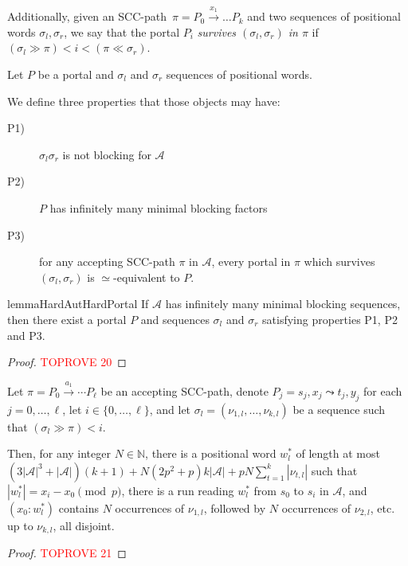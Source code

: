 \documentclass[letterpaper, USenglish, cleveref, autoref, thm-restate, numberwithinsect]{lipics-v2021}
\theoremstyle{theorem}
\theoremstyle{definition}
\newcommand{\Aa}{\mathcal{A}}
\newcommand{\curly}{\mathrel{\leadsto}}
\newcommand{\equivportals}{\simeq}
\newcommand{\lefteffect}[2]{(#1 \gg #2)}
\newcommand{\NN}{\mathbb{N}}
\newcommand{\portal}[4]{#1,#2 \curly #3, #4}
\newcommand{\righteffect}[2]{(#2 \ll #1)}
\newcommand{\SCCpath}{\pi}
\newcommand{\set}[1]{\{ #1 \}}
\newcommand{\timedword}[2]{(#1:#2)}
\begin{document}
Additionally, given an SCC-path~$\SCCpath = P_0\xrightarrow{x_1} \ldots P_k$ and two sequences of positional words $\sigma_l, \sigma_r$, we say that the portal $P_i$ \emph{survives $(\sigma_l, \sigma_r)$ in $\SCCpath$} if $\lefteffect{\sigma_l}{\SCCpath} < i < \righteffect{\sigma_r}{\SCCpath}$.

\begin{definition}
	Let $P$ be a portal and  $\sigma_l$ and $\sigma_r$ sequences of positional words.
	
	We define three properties that those objects may have:
	\begin{description}\item[P1)] $\sigma_l \sigma_r$ is not blocking for $\Aa$
		\item[P2)] $P$ has infinitely many minimal blocking factors
		\item[P3)] for any accepting SCC-path $\SCCpath$ in $\Aa$, 
		every portal in $\SCCpath$ which survives $(\sigma_l, \sigma_r)$ is $\equivportals$-equivalent to $P$.
	\end{description}
\end{definition}

\begin{restatable}{lemma}{HardAutHardPortal}
	\label{lem:hard-aut-to-hard-portal}
	If $\Aa$ has infinitely many minimal blocking sequences, then there exist a portal $P$ and sequences $\sigma_l$ and $\sigma_r$ satisfying properties P1, P2 and P3.
\end{restatable}
\begin{proof}\textcolor{red}{TOPROVE 20}\end{proof}

\begin{lemma}
	\label{lem:seq-left}
	Let $\SCCpath = P_0 \xrightarrow{a_1} \cdots  P_\ell$ be an accepting SCC-path,
	denote $P_j = \portal{s_j}{x_j}{t_j}{y_j}$ for each $j = 0,\ldots,\ell$,
	let $i \in \set{0, \ldots, \ell}$,
	and let $\sigma_l = (\nu_{1,l}, \ldots, \nu_{k,l})$ be a sequence such that $\lefteffect{\sigma_l}{\SCCpath} < i$.

	Then, for any integer $N \in \NN$, there is a positional word $w_l^*$ of length at most $(3|\Aa|^3+|\Aa|)(k+1)  + N(2p^2+p)k|\Aa| + pN\sum_{t=1}^k|\nu_{t,l}|$ such that $|w_l^*| = x_i-x_0 \pmod{p}$, there is a run reading $w_l^*$ from $s_0$ to $s_i$ in $\Aa$, and $\timedword{x_0}{w_l^*}$ contains $N$ occurrences of $\nu_{1,l}$, followed by $N$ occurrences of $\nu_{2,l}$, etc. up to $\nu_{k,l}$, all disjoint.
\end{lemma}
\begin{proof}\textcolor{red}{TOPROVE 21}\end{proof}
\end{document}
